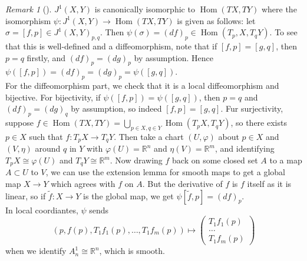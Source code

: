 \documentclass[reqno]{amsart}
\theoremstyle{definition}
\theoremstyle{remark}
\newtheorem*{remark}{Remark}
\DeclareMathOperator{\Hom}{Hom}
\begin{document}
\begin{remark}[]
    $J^{1}(X,Y)$ is canonically isomorphic to
    $\Hom \left( TX, TY \right) $ where
    the isomorphism
    $\psi \colon J^{1}(X,Y) \to 
    \Hom(TX,TY)$ is given as follows:
    let $\sigma = \left[ f,p \right] \in 
    J^{1}(X,Y)_{p,q}$. Then
    $ \psi (\sigma) = (df)_p \in 
    \Hom \left( T_p, X, T_qY \right) 
    $.
    To see that this is well-defined and a
    diffeomorphism, note that
    if $\left[ f,p \right] =
    \left[ g,q \right] $, then
    $p = q$ firstly, and
    $(df)_p = (dg)_p$ by assumption. Hence
    $\psi \left( \left[ f,p \right]  \right) 
    = \left( df \right)_p = 
    \left( dg \right)_p = 
    \psi \left( \left[ g,q \right]  \right) $.\\
    For the diffeomorphism part, we check that it is a
    local diffeomorphism and bijective. 
    For bijectivity, 
    if
    $\psi \left( \left[ f,p \right]  \right) 
    = \psi \left( \left[ g,q \right]  \right) $, then
    $p= q$ and
    $\left( df \right)_p = \left( dg \right)_q$ by
    assumption, so indeed
    $\left[ f,p \right] = \left[ g,q \right] $.
    Fur surjectivity, suppose
    $f \in \Hom \left( TX,TY \right)
    = \bigcup_{p \in X, q \in Y} 
    \Hom \left( T_pX, T_{q}Y \right) $, so
    there exists 
    $p \in X$ such that
    $f \colon T_pX \to T_{q} Y$.
    Then take a chart
    $\left( U, \varphi  \right) $ about
    $p \in X$ and $\left( V, \eta \right) $ around
    $q$ in $Y$ with
    $\varphi (U) = \mathbb{R}^{n}$ and
    $\eta(V) = \mathbb{R}^{m}$, and identifying
    $T_p X \cong \varphi (U)$ and
    $T_qY \cong \mathbb{R}^{m}$. Now drawing $f$ back on
    some closed set $A$ to a map
    $A \subset U$ to
    $V$, we can use the extension lemma for smooth maps to
    get a global map
    $X \to Y$ which agrees with
    $f$ on $A$. But the derivative of
    $f$ is $f$ itself as it is linear, so
    if  $\tilde{f} \colon X \to Y$ is the global map, we
    get
    $\psi \left[ \tilde{f},p \right] 
    = \left( df \right)_p$.\\
    In local coordiantes, $\psi $ sends
    \[
        \left( p, f(p), T_1f_1(p),\ldots,
        T_1 f_m(p)\right) \mapsto 
        \begin{pmatrix} T_1 f_1(p)\\ \ldots \\ T_1f_m(p)
        \end{pmatrix} 
    \] 
    when we identify
    $A_n^{1} \cong
    \mathbb{R}^{n}$, which is smooth.
\end{remark}
\end{document}
